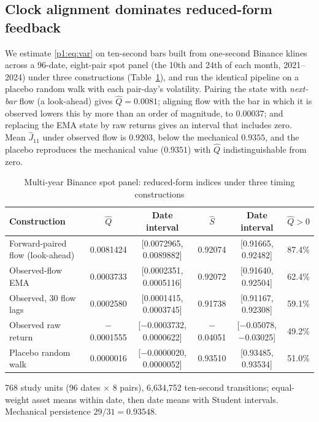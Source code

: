 \subsection{Clock alignment dominates reduced-form feedback}

We estimate \eqref{p1:eq:var} on ten-second bars built from one-second Binance klines across a 96-date, eight-pair spot panel (the 10th and 24th of each month, 2021--2024) under three constructions (Table~\ref{p1:tab:panel}), and run the identical pipeline on a placebo random walk with each pair-day's volatility. Pairing the state with \emph{next-bar} flow (a look-ahead) gives $\hat Q=0.0081$; aligning flow with the bar in which it is observed lowers this by more than an order of magnitude, to $0.00037$; and replacing the EMA state by raw returns gives an interval that includes zero. Mean $\hat J_{11}$ under observed flow is $0.9203$, below the mechanical $0.9355$, and the placebo reproduces the mechanical value ($0.9351$) with $\hat Q$ indistinguishable from zero. 

\begin{table}[t]\centering\small
\begin{threeparttable}
\caption{Multi-year Binance spot panel: reduced-form indices under three timing constructions}\label{p1:tab:panel}
\setlength{\tabcolsep}{2.5pt}
\renewcommand{\arraystretch}{1.1}
\begin{tabular}{p{}ccccc}
\toprule
Construction & $\hat Q$ & Date interval & $\hat S$ & Date interval & $\hat Q>0$\\
\midrule
Forward-paired flow (look-ahead) & 0.0081424 & [0.0072965, 0.0089882] & 0.92074 & [0.91665, 0.92482] & 87.4\%\\
Observed-flow EMA & 0.0003733 & [0.0002351, 0.0005116] & 0.92072 & [0.91640, 0.92504] & 62.4\%\\
Observed, 30 flow lags & 0.0002580 & [0.0001415, 0.0003745] & 0.91738 & [0.91167, 0.92308] & 59.1\%\\
Observed raw return & $-$0.0001555 & [$-$0.0003732, 0.0000622] & $-$0.04051 & [$-$0.05078, $-$0.03025] & 49.2\%\\
Placebo random walk & 0.0000016 & [$-$0.0000020, 0.0000052] & 0.93510 & [0.93485, 0.93534] & 51.0\%\\
\bottomrule
\end{tabular}
\begin{tablenotes}\footnotesize\item 768 study units (96 dates $\times$ 8 pairs), 6{,}634{,}752 ten-second transitions; equal-weight asset means within date, then date means with Student intervals. Mechanical persistence $29/31=0.93548$. \end{tablenotes}
\end{threeparttable}
\end{table}

